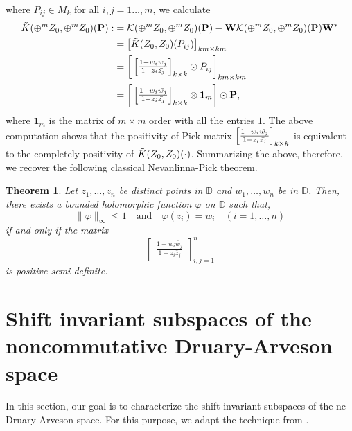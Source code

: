 \documentclass[12pt]{amsart}%
\newtheorem{theorem}{Theorem}[section]
\numberwithin{equation}{section}
\newcommand{\clk}{\mathcal{K}}
\newcommand{\D}{\mathbb{D}}
\begin{document}
where $P_{ij}\in M_k$ for all $i,j=1\ldots,m$, we calculate
\allowdisplaybreaks
\begingroup
\begin{align*}
\Tilde{K}(\oplus^m Z_0, \oplus^m Z_0)(\mathbf{P}):&=\clk(\oplus^m Z_0, \oplus^m Z_0)(\mathbf{P})-\mathbf{W} \clk(\oplus^m Z_0, \oplus^m Z_0)(\mathbf{P}) \mathbf{W}^*\\
&= \big[\Tilde{K}(Z_0, Z_0)(P_{ij})\big]_{km\times km}\\
&=\bigg[\begin{bmatrix}\frac{1-w_i\Bar{w_j}}{1-z_i\Bar{z_j}}\end{bmatrix}_{k\times k} \odot P_{ij} \bigg]_{km\times km}\\
&=\bigg[\begin{bmatrix}\frac{1-w_i\Bar{w_j}}{1-z_i\Bar{z_j}}\end{bmatrix}_{k\times k}\otimes \mathbf{1}_m\bigg]\odot \mathbf{P},
\end{align*}
\endgroup
where $\mathbf{1}_m$ is the matrix of $m\times m$ order with all the entries $1$.
The above computation shows that the positivity of Pick matrix $\begin{bmatrix}\frac{1-w_i\Bar{w_j}}{1-z_i\Bar{z_j}}\end{bmatrix}_{k\times k}$ is equivalent to the completely positivity of $\Tilde{K}(Z_0, Z_0)(\cdot)$. Summarizing the above, therefore, we recover the following classical Nevanlinna-Pick theorem.
\begin{theorem}
Let $z_1,\ldots,z_n$ be distinct points in $\D$ and $w_1,\ldots,w_n$ be in $\D$. Then, there exists a bounded holomorphic function $\varphi$ on $\D$ such that,
\[
\|\varphi\|_{\infty}\leq 1\quad\text{and}\quad\varphi(z_i)=w_i\quad(i=1,\ldots,n)
\]
if and only if the matrix
\[
\begin{bmatrix}
	\frac{1-w_i\bar w_j}{1-z_i\bar z_j}
\end{bmatrix}_{i,j=1}^n
\]
is positive semi-definite.
\end{theorem}

\section{Shift invariant subspaces of the noncommutative Druary-Arveson space}\label{invariant subspace}
In this section, our goal is to characterize the shift-invariant subspaces of the nc Druary-Arveson space. For this purpose, we adapt the technique from \cite{Sarkar-I, Sarkar-II}. 
\end{document}
